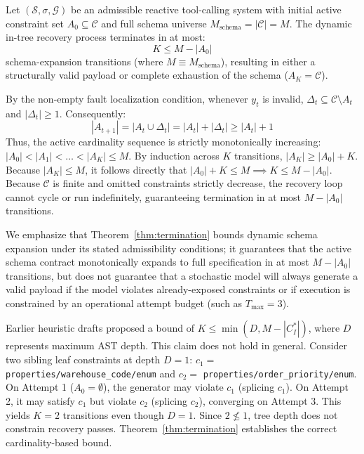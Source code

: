 \begin{theorem}
\label{thm:termination}
Let $(\mathcal{S}, \sigma, \mathcal{G})$ be an admissible reactive tool-calling system with initial active constraint set $A_0 \subseteq \mathcal{C}$ and full schema universe $M_{\text{schema}} = |\mathcal{C}| = M$. The dynamic in-tree recovery process terminates in at most:
\begin{equation}
\boxed{K \le M - |A_0|}
\end{equation}
schema-expansion transitions (where $M \equiv M_{\text{schema}}$), resulting in either a structurally valid payload or complete exhaustion of the schema ($A_K = \mathcal{C}$).
\end{theorem}

\begin{IEEEproof}
By the non-empty fault localization condition, whenever $y_t$ is invalid, $\Delta_t \subseteq \mathcal{C} \setminus A_t$ and $|\Delta_t| \ge 1$. Consequently:
\begin{equation}
|A_{t+1}| = |A_t \cup \Delta_t| = |A_t| + |\Delta_t| \ge |A_t| + 1
\end{equation}
Thus, the active cardinality sequence is strictly monotonically increasing: $|A_0| < |A_1| < \dots < |A_K| \le M$. By induction across $K$ transitions, $|A_K| \ge |A_0| + K$. Because $|A_K| \le M$, it follows directly that $|A_0| + K \le M \implies K \le M - |A_0|$. Because $\mathcal{C}$ is finite and omitted constraints strictly decrease, the recovery loop cannot cycle or run indefinitely, guaranteeing termination in at most $M - |A_0|$ transitions.
\end{IEEEproof}
We emphasize that Theorem~\ref{thm:termination} bounds dynamic schema expansion under its stated admissibility conditions; it guarantees that the active schema contract monotonically expands to full specification in at most $M - |A_0|$ transitions, but does not guarantee that a stochastic model will always generate a valid payload if the model violates already-exposed constraints or if execution is constrained by an operational attempt budget (such as $T_{\text{max}} = 3$).

\begin{remark}
Earlier heuristic drafts proposed a bound of $K \le \min(D, M - |C_I^*|)$, where $D$ represents maximum AST depth. This claim does not hold in general. Consider two sibling leaf constraints at depth $D = 1$: $c_1 =$ \texttt{properties/warehouse\_code/enum} and $c_2 =$ \texttt{properties/order\_priority/enum}. On Attempt 1 ($A_0 = \emptyset$), the generator may violate $c_1$ (splicing $c_1$). On Attempt 2, it may satisfy $c_1$ but violate $c_2$ (splicing $c_2$), converging on Attempt 3. This yields $K = 2$ transitions even though $D = 1$. Since $2 \not\le 1$, tree depth does not constrain recovery passes. Theorem~\ref{thm:termination} establishes the correct cardinality-based bound.
\end{remark}

